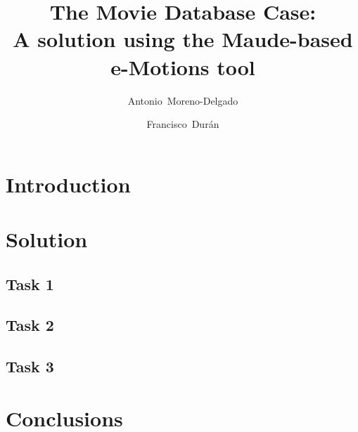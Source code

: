 \documentclass[draft]{llncs}
\title{The Movie Database Case: \\ A solution using the Maude-based e-Motions tool}
\author{Antonio~Moreno-Delgado \and Francisco~Dur\'an}
\institute{
    University of M\'alaga\\
    \email{\{amoreno,duran\}@lcc.uma.es}
    }
\begin{document}
\maketitle

\begin{abstract}

\end{abstract}

\section{Introduction}
\label{sec:intro}


\section{Solution}
\label{sec:solution}


\subsection{Task 1}
\label{sub:task1}


\subsection{Task 2}
\label{sub:task2}


\subsection{Task 3}
\label{sub:task3}


\section{Conclusions}





\providecommand{\url}[1]{\texttt{#1}}
\end{document}
